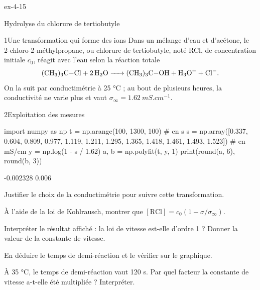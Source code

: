 \begin{blocLivre}{ex-4-15}
\begin{exercice}[3]{Hydrolyse du chlorure de tertiobutyle}
\begin{docu}{1}{Une transformation qui forme des ions}
Dans un mélange d'eau et d'acétone, le 2-chloro-2-méthylpropane, ou chlorure de tertiobutyle, noté RCl, de
concentration initiale $c_0$, réagit avec l'eau selon la réaction totale
\[\ce{(CH3)3C-Cl + 2 H2O -> (CH3)3C-OH + H3O+ + Cl-}.\]
On la suit par conductimétrie à 25 °C ; au bout de plusieurs heures, la conductivité ne varie plus et vaut
$\sigma_\infty=\qty{1,62}{mS.cm^{-1}}$.
\end{docu}
\begin{docu}{2}{Exploitation des mesures}
\begin{python}
import numpy as np
t = np.arange(100, 1300, 100)          # en s
s = np.array([0.337, 0.604, 0.809, 0.977, 1.119, 1.211, 1.295,
              1.365, 1.418, 1.461, 1.493, 1.523])   # en mS/cm
y = np.log(1 - s / 1.62)
a, b = np.polyfit(t, y, 1)
print(round(a, 6), round(b, 3))
\end{python}
\begin{console}
-0.002328 0.006
\end{console}
\end{docu}
\begin{questions}
\item Justifier le choix de la conductimétrie pour suivre cette transformation.
\item À l'aide de la loi de Kohlrausch, montrer que $[\mathrm{RCl}]=c_0\left(1-\sigma/\sigma_\infty\right)$.
\item {}Interpréter le résultat affiché : la loi de vitesse est-elle d'ordre 1 ? Donner la
valeur de la constante de vitesse.
\item En déduire le temps de demi-réaction et le vérifier sur le graphique.
\item \initiative À 35 °C, le temps de demi-réaction vaut 120 s. Par quel facteur la constante de vitesse a-t-elle été
multipliée ? Interpréter.
\end{questions}
\end{exercice}
\end{blocLivre}
